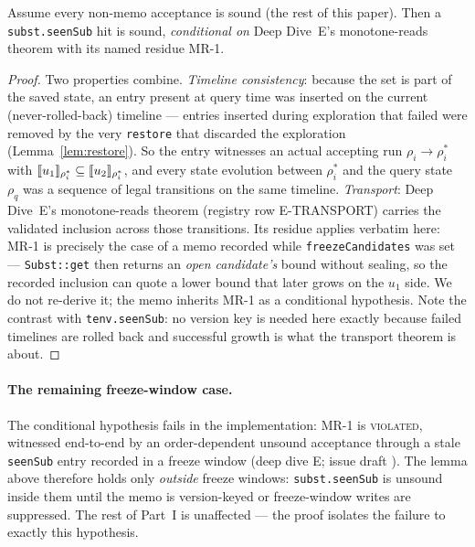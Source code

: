 \documentclass[11pt]{article}
\begin{document}
\begin{theorem}
\label{thm:memo}
Assume every non-memo acceptance is sound (the rest of this paper). Then
a \texttt{subst.seenSub} hit is sound, \emph{conditional on} Deep Dive~E's
monotone-reads theorem with its named residue MR-1.
\end{theorem}
\begin{proof}
Two properties combine. \emph{Timeline consistency}: because the set is
part of the saved state, an entry present at query time was inserted on
the current (never-rolled-back) timeline --- entries inserted during
exploration that failed were removed by the very \texttt{restore} that
discarded the exploration (Lemma~\ref{lem:restore}). So the entry
witnesses an actual accepting run $\rho_i \to \rho_i^\ast$ with
$\llbracket u_1 \rrbracket_{\rho_i^\ast} \subseteq \llbracket u_2 \rrbracket_{\rho_i^\ast}$, and every
state evolution between $\rho_i^\ast$ and the query state $\rho_q$ was a
sequence of legal transitions on the same timeline.
\emph{Transport}: Deep Dive~E's monotone-reads theorem (registry row
E-TRANSPORT) carries the
validated inclusion across those transitions. Its residue applies
verbatim here: MR-1 is precisely the case of a memo recorded while
\texttt{freezeCandidates} was set --- \texttt{Subst::get} then returns an
\emph{open candidate's} bound without sealing, so the recorded inclusion
can quote a lower bound that later grows on the $u_1$ side. We do not
re-derive it; the memo inherits MR-1 as a conditional hypothesis. Note
the contrast with \texttt{tenv.seenSub}: no version key is needed here
exactly because failed timelines are rolled back and successful growth
is what the transport theorem is about.
\end{proof}

\paragraph{The remaining freeze-window case.} The conditional hypothesis fails
in the implementation: MR-1 is \textsc{violated}, witnessed end-to-end
by an order-dependent unsound acceptance through a stale
\texttt{seenSub} entry recorded in a freeze window (deep dive E; issue
draft ). The lemma
above therefore holds only \emph{outside} freeze windows:
\texttt{subst.seenSub} is unsound inside them until the memo is
version-keyed or freeze-window writes are suppressed. The rest of Part~I
is unaffected — the proof isolates the failure to exactly this
hypothesis.
\end{document}
